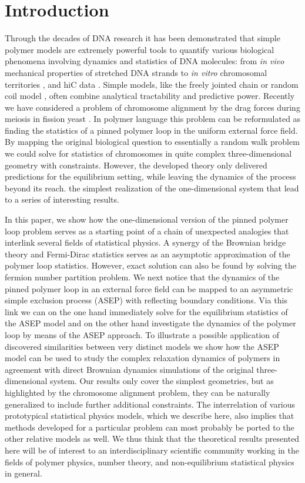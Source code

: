 \documentclass[aps,showpacs,twocolumn,floatfix,prx,superscriptaddress]{revtex4-1}
\begin{document}
\section{Introduction}
Through the decades of DNA research it has been demonstrated that simple polymer
models are extremely powerful tools to quantify various biological phenomena
involving dynamics and statistics of DNA molecules: from {\em in vivo}
mechanical properties of stretched DNA strands \cite{} to {\em in vitro}
chromosomal territories \cite{}, and hiC data \cite{}. Simple models, like the
freely jointed chain or random coil model \cite{}, often combine analytical
tractability and predictive power. Recently we have considered a problem of
chromosome alignment by the drag forces during meiosis in fission yeast \cite{}.
In polymer language this problem can be reformulated as finding the statistics
of a pinned polymer loop in the uniform external force field. By mapping the
original biological question to essentially a random walk problem we could solve
for statistics of chromosomes in quite complex three-dimensional geometry with
constraints. However, the developed theory only delivered predictions for the
equilibrium setting, while leaving the dynamics of the process beyond its reach.
the simplest realization of the one-dimensional system that lead to a series of
interesting results.

In this paper, we show how the one-dimensional version of the pinned polymer
loop problem serves as a starting point of a chain of unexpected analogies that
interlink several fields of statistical physics. A synergy of the Brownian
bridge theory and Fermi-Dirac statistics serves as an asymptotic approximation
of the polymer loop statistics. However, exact solution can also be found by
solving the fermion number partition problem. We next notice that the dynamics
of the pinned polymer loop in an external force field can be mapped to an
asymmetric simple exclusion process (ASEP) with reflecting boundary conditions.
Via this link we can on the one hand immediately solve for the equilibrium
statistics of the ASEP model and on the other hand investigate the dynamics of
the polymer loop by means of the ASEP approach. To illustrate a possible
application of discovered similarities between very distinct models we show how
the ASEP model can be used to study the complex relaxation dynamics of polymers
in agreement with direct Brownian dynamics simulations of the original
three-dimensional system. Our results only cover the simplest geometries, but as
highlighted by the chromosome alignment problem, they can be naturally
generalized to include further additional constraints. The interrelation of
various prototypical statistical physics models, which we describe here, also
implies that methods developed for a particular problem can most probably be
ported to the other relative models as well. We thus think that the theoretical
results presented here will be of interest to an interdisciplinary scientific
community working in the fields of polymer physics, number theory, and
non-equilibrium statistical physics in general. 
\end{document}
